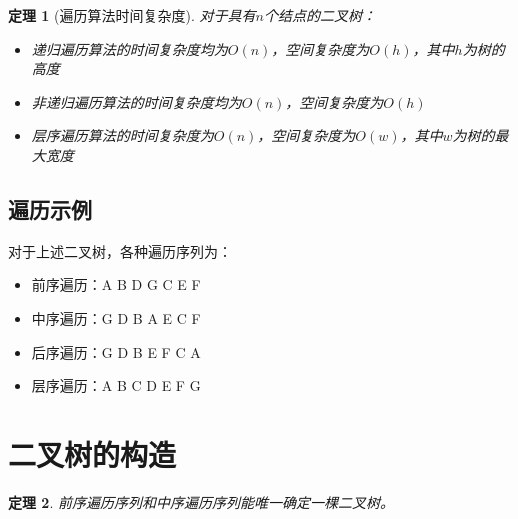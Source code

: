 \documentclass[12pt,a4paper]{amsart}
\newtheorem{theorem}{定理}[section]
\begin{document}
\begin{theorem}[遍历算法时间复杂度]
对于具有$n$个结点的二叉树：
\begin{itemize}
\item 递归遍历算法的时间复杂度均为$O(n)$，空间复杂度为$O(h)$，其中$h$为树的高度
\item 非递归遍历算法的时间复杂度均为$O(n)$，空间复杂度为$O(h)$
\item 层序遍历算法的时间复杂度为$O(n)$，空间复杂度为$O(w)$，其中$w$为树的最大宽度
\end{itemize}
\end{theorem}

\subsection{遍历示例}

\begin{center}
\end{center}

对于上述二叉树，各种遍历序列为：
\begin{itemize}
\item 前序遍历：A B D G C E F
\item 中序遍历：G D B A E C F
\item 后序遍历：G D B E F C A
\item 层序遍历：A B C D E F G
\end{itemize}

\section{二叉树的构造}

\begin{theorem}
前序遍历序列和中序遍历序列能唯一确定一棵二叉树。
\end{theorem}
\end{document}
